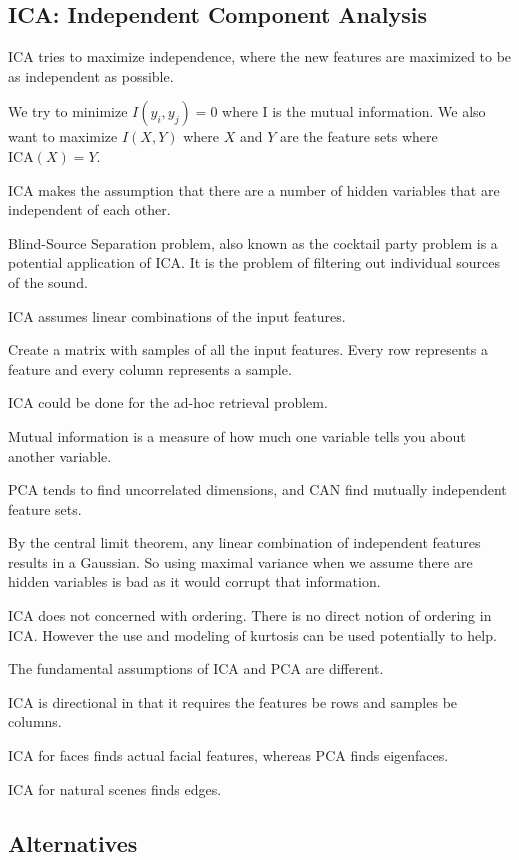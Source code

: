 \documentclass{article}
\begin{document}
\subsection{ICA: Independent Component Analysis}
ICA tries to maximize independence, where the new features are maximized to be
as independent as possible. 

We try to minimize $I(y_i, y_j) = 0$ where I is the mutual information. We also 
want to maximize $I(X,Y)$ where $X$ and $Y$ are the feature sets where 
$\text{ICA}(X) = Y$. 

ICA makes the assumption that there are a number of hidden variables that are
independent of each other. 

Blind-Source Separation problem, also known as the cocktail party problem is a 
potential application of ICA. It is the problem of filtering out individual 
sources of the sound. 

ICA assumes linear combinations of the input features. 

Create a matrix with samples of all the input features. Every row represents
a feature and every column represents a sample. 

ICA could be done for the ad-hoc retrieval problem. 

Mutual information is a measure of how much one variable tells you about another
variable. 

PCA tends to find uncorrelated dimensions, and CAN find mutually independent 
feature sets. 

By the central limit theorem, any linear combination of independent features 
results in a Gaussian. So using maximal variance when we assume there are hidden
variables is bad as it would corrupt that information.

ICA does not concerned with ordering. There is no direct notion of ordering in 
ICA. However the use and modeling of kurtosis can be used potentially to help. 

The fundamental assumptions of ICA and PCA are different. 

ICA is directional in that it requires the features be rows and samples be
columns. 

ICA for faces finds actual facial features, whereas PCA finds eigenfaces.

ICA for natural scenes finds edges. 

\subsection{Alternatives}
\end{document}
